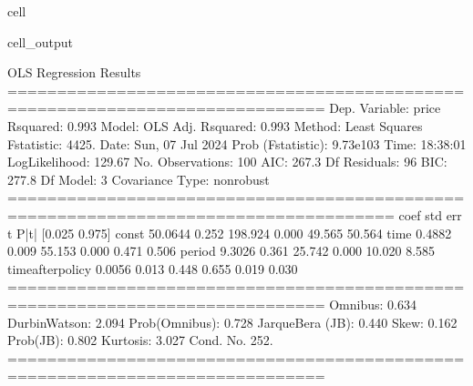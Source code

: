 \documentclass[letterpaper,10pt,english]{jupyterBook}
\begin{document}
\begin{sphinxuseclass}{cell}
\begin{sphinxVerbatimOutput}
\begin{sphinxuseclass}{cell_output}
\begin{sphinxVerbatim}[commandchars=\\\{\}]
                            OLS Regression Results                            
==============================================================================
Dep. Variable:                  price   R\PYGZhy{}squared:                       0.993
Model:                            OLS   Adj. R\PYGZhy{}squared:                  0.993
Method:                 Least Squares   F\PYGZhy{}statistic:                     4425.
Date:                Sun, 07 Jul 2024   Prob (F\PYGZhy{}statistic):          9.73e\PYGZhy{}103
Time:                        18:38:01   Log\PYGZhy{}Likelihood:                \PYGZhy{}129.67
No. Observations:                 100   AIC:                             267.3
Df Residuals:                      96   BIC:                             277.8
Df Model:                           3                                         
Covariance Type:            nonrobust                                         
=====================================================================================
                        coef    std err          t      P\PYGZgt{}|t|      [0.025      0.975]
\PYGZhy{}\PYGZhy{}\PYGZhy{}\PYGZhy{}\PYGZhy{}\PYGZhy{}\PYGZhy{}\PYGZhy{}\PYGZhy{}\PYGZhy{}\PYGZhy{}\PYGZhy{}\PYGZhy{}\PYGZhy{}\PYGZhy{}\PYGZhy{}\PYGZhy{}\PYGZhy{}\PYGZhy{}\PYGZhy{}\PYGZhy{}\PYGZhy{}\PYGZhy{}\PYGZhy{}\PYGZhy{}\PYGZhy{}\PYGZhy{}\PYGZhy{}\PYGZhy{}\PYGZhy{}\PYGZhy{}\PYGZhy{}\PYGZhy{}\PYGZhy{}\PYGZhy{}\PYGZhy{}\PYGZhy{}\PYGZhy{}\PYGZhy{}\PYGZhy{}\PYGZhy{}\PYGZhy{}\PYGZhy{}\PYGZhy{}\PYGZhy{}\PYGZhy{}\PYGZhy{}\PYGZhy{}\PYGZhy{}\PYGZhy{}\PYGZhy{}\PYGZhy{}\PYGZhy{}\PYGZhy{}\PYGZhy{}\PYGZhy{}\PYGZhy{}\PYGZhy{}\PYGZhy{}\PYGZhy{}\PYGZhy{}\PYGZhy{}\PYGZhy{}\PYGZhy{}\PYGZhy{}\PYGZhy{}\PYGZhy{}\PYGZhy{}\PYGZhy{}\PYGZhy{}\PYGZhy{}\PYGZhy{}\PYGZhy{}\PYGZhy{}\PYGZhy{}\PYGZhy{}\PYGZhy{}\PYGZhy{}\PYGZhy{}\PYGZhy{}\PYGZhy{}\PYGZhy{}\PYGZhy{}\PYGZhy{}\PYGZhy{}
const                50.0644      0.252    198.924      0.000      49.565      50.564
time                  0.4882      0.009     55.153      0.000       0.471       0.506
period               \PYGZhy{}9.3026      0.361    \PYGZhy{}25.742      0.000     \PYGZhy{}10.020      \PYGZhy{}8.585
time\PYGZus{}after\PYGZus{}policy     0.0056      0.013      0.448      0.655      \PYGZhy{}0.019       0.030
==============================================================================
Omnibus:                        0.634   Durbin\PYGZhy{}Watson:                   2.094
Prob(Omnibus):                  0.728   Jarque\PYGZhy{}Bera (JB):                0.440
Skew:                          \PYGZhy{}0.162   Prob(JB):                        0.802
Kurtosis:                       3.027   Cond. No.                         252.
==============================================================================


\end{sphinxVerbatim}
\end{sphinxuseclass}
\end{sphinxVerbatimOutput}
\end{sphinxuseclass}
\end{document}
